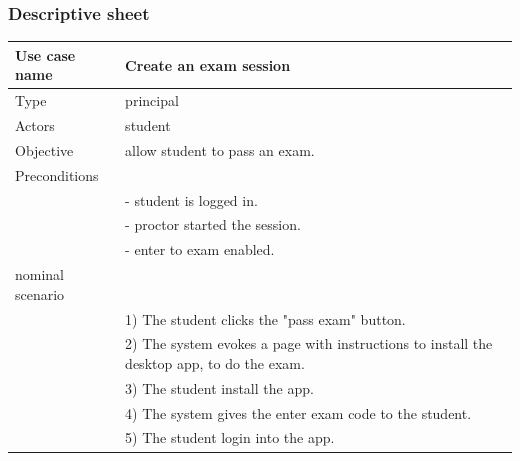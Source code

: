 \documentclass[]{uc2pfecaneva}
\begin{document}
\subsubsection{Descriptive sheet}
\begin{table}[h]
	\centering
	\begin{tabularx}{\textwidth}{|l|X|}
		\hline
		Use case name         & Create an exam session                                                                            \\ \hline
		Type                  & principal                                                                                         \\ \hline
		Actors                & student                                                                                           \\ \hline
		Objective             & allow student to pass an exam.                                                                    \\ \hline
		Preconditions         &                                                                                                   \\
		                      & - student is logged in.                                                                           \\
		                      & - proctor started the session.                                                                    \\
		                      & - enter to exam enabled.                                                                          \\ \hline
		nominal scenario      &                                                                                                   \\
		                      & 1) The student clicks the "pass exam" button.                                                     \\
		                      & 2) The system evokes a page with instructions to install the desktop app, to do the exam.         \\
		                      & 3) The student install the app.                                                                   \\
		                      & 4) The system gives the enter exam code to the student.                                           \\
		                      & 5) The student login into the app.                                                                \\

\end{tabularx}
\end{table}
\end{document}
